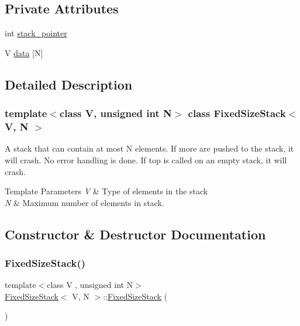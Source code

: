 \subsection*{Private Attributes}
\begin{DoxyCompactItemize}
\item 
int \mbox{\hyperlink{classFixedSizeStack_a87e0a013c62888f127f57309e32ed70e}{stack\+\_\+pointer}}
\item 
V \mbox{\hyperlink{classFixedSizeStack_a25c7e307ab4079edafe72446c411aa74}{data}} \mbox{[}N\mbox{]}
\end{DoxyCompactItemize}


\subsection{Detailed Description}
\subsubsection*{template$<$class V, unsigned int N$>$\newline
class Fixed\+Size\+Stack$<$ V, N $>$}

A stack that can contain at most N elements. If more are pushed to the stack, it will crash. No error handling is done. If top is called on an empty stack, it will crash. 


\begin{DoxyTemplParams}{Template Parameters}
{\em V} & Type of elements in the stack \\
\hline
{\em N} & Maximum number of elements in stack. \\
\hline
\end{DoxyTemplParams}


\subsection{Constructor \& Destructor Documentation}
\mbox{\label{classFixedSizeStack_ab8090e6bfc34b69664fde6f7a9663071}} 
\subsubsection{\texorpdfstring{FixedSizeStack()}{FixedSizeStack()}}
{\footnotesize\ttfamily template$<$class V , unsigned int N$>$ \\
\mbox{\hyperlink{classFixedSizeStack}{Fixed\+Size\+Stack}}$<$ V, N $>$\+::\mbox{\hyperlink{classFixedSizeStack}{Fixed\+Size\+Stack}} (\begin{DoxyParamCaption}{ }\end{DoxyParamCaption})\hspace{0.3cm}{\ttfamily [inline]}}



